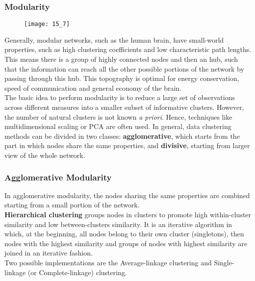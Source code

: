 \subsubsection{Modularity}
\begin{figure}[H]
    \centering
    \texttt{[image: 15\_7]}
\end{figure}
Generally, modular networks, such as the human brain, have small-world properties, such as high clustering coefficients
and low characteristic path lengths.\\
This means there is a group of highly connected nodes and then an hub, such that the information can reach all the other
possible portions of the network by passing through this hub. This topography is optimal for energy conservation, speed
of communication and general economy of the brain.\\
The basic idea to perform modularity is to reduce a large set of observations across different measures into a smaller
subset of informative clusters. However, the number of natural clusters is not known \textit{a priori}. Hence, techniques
like multidimensional scaling or PCA are often used. In general, data clustering methods can be divided in two classes:
\textbf{agglomerative}, which starts from the part in which nodes share the same properties, and \textbf{divisive},
starting from larger view of the whole network.
\subsubsection{Agglomerative Modularity}
In agglomerative modularity, the nodes sharing the same properties are combined starting from a small portion
of the network.\\
\textbf{Hierarchical clustering} groups nodes in clusters to promote high within-cluster similarity and low
between-clusters similarity. It is an iterative algorithm in which, at the beginning, all nodes belong to their own cluster
(singletons), then nodes with the highest similarity and groups of nodes with highest similarity are joined in an iterative
fashion.\\
Two possible implementations are the Average-linkage clustering and Single-linkage (or Complete-linkage) clustering.
